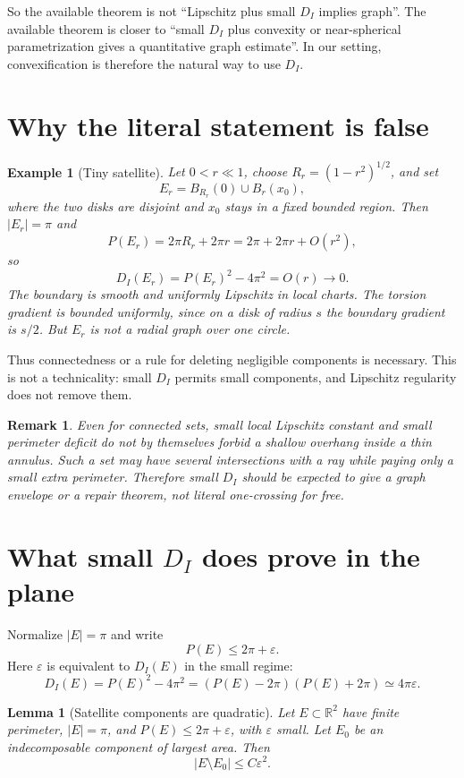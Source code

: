 \documentclass[11pt]{article}
\newtheorem{lemma}[theorem]{Lemma}
\newtheorem{remark}[theorem]{Remark}
\newtheorem{example}[theorem]{Example}
\newcommand{\R}{\mathbb R}
\newcommand{\DI}{D_I}
\begin{document}
So the available theorem is not ``Lipschitz plus small \(D_I\) implies graph''.
The available theorem is closer to ``small \(D_I\) plus convexity or
near-spherical parametrization gives a quantitative graph estimate''.  In our
setting, convexification is therefore the natural way to use \(D_I\).

\section{Why the literal statement is false}

\begin{example}[Tiny satellite]
Let \(0<r\ll1\), choose \(R_r=(1-r^2)^{1/2}\), and set
\[
   E_r=B_{R_r}(0)\cup B_r(x_0),
\]
where the two disks are disjoint and \(x_0\) stays in a fixed bounded region.
Then \(|E_r|=\pi\) and
\[
   P(E_r)=2\pi R_r+2\pi r
      =2\pi+2\pi r+O(r^2),
\]
so
\[
   \DI(E_r)=P(E_r)^2-4\pi^2=O(r)\to0 .
\]
The boundary is smooth and uniformly Lipschitz in local charts.  The torsion
gradient is bounded uniformly, since on a disk of radius \(s\) the boundary
gradient is \(s/2\).  But \(E_r\) is not a radial graph over one circle.
\end{example}

Thus connectedness or a rule for deleting negligible components is necessary.
This is not a technicality: small \(D_I\) permits small components, and
Lipschitz regularity does not remove them.

\begin{remark}
Even for connected sets, small local Lipschitz constant and small perimeter
deficit do not by themselves forbid a shallow overhang inside a thin annulus.
Such a set may have several intersections with a ray while paying only a small
extra perimeter.  Therefore small \(D_I\) should be expected to give a
graph envelope or a repair theorem, not literal one-crossing for free.
\end{remark}

\section{What small \(D_I\) does prove in the plane}

Normalize \(|E|=\pi\) and write
\[
   P(E)\le 2\pi+\varepsilon.
\]
Here \(\varepsilon\) is equivalent to \(D_I(E)\) in the small regime:
\[
   \DI(E)=P(E)^2-4\pi^2
      =(P(E)-2\pi)(P(E)+2\pi)
      \simeq 4\pi\varepsilon .
\]

\begin{lemma}[Satellite components are quadratic]
\label{lem:sat}
Let \(E\subset\R^2\) have finite perimeter, \(|E|=\pi\), and
\(P(E)\le2\pi+\varepsilon\), with \(\varepsilon\) small.  Let \(E_0\) be an
indecomposable component of largest area.  Then
\[
   |E\setminus E_0|\le C\varepsilon^2 .
\]
\end{lemma}
\end{document}
